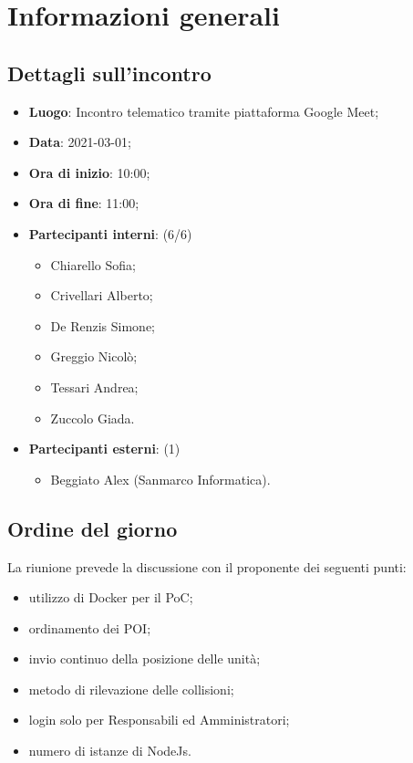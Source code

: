 \section{Informazioni generali}

\subsection{Dettagli sull'incontro}
\begin{itemize}
\item \textbf{Luogo}: Incontro telematico tramite piattaforma Google Meet;
\item \textbf{Data}: 2021-03-01;
\item \textbf{Ora di inizio}: 10:00;
\item \textbf{Ora di fine}: 11:00;
\item \textbf{Partecipanti interni}: (6/6)
\begin{itemize}
	\item Chiarello Sofia;
	\item Crivellari Alberto;
	\item De Renzis Simone;
	\item Greggio Nicolò;
	\item Tessari Andrea;
	\item Zuccolo Giada.
\end{itemize}
\item \textbf{Partecipanti esterni}: (1)
\begin{itemize}
	\item Beggiato Alex (Sanmarco Informatica).
\end{itemize}
\end{itemize}

\subsection{Ordine del giorno}

La riunione prevede la discussione con il proponente dei seguenti punti:
\begin{itemize}
	\item utilizzo di Docker per il PoC;
	\item ordinamento dei POI;
	\item invio continuo della posizione delle unità;
	\item metodo di rilevazione delle collisioni;
	\item login solo per Responsabili ed Amministratori;
	\item numero di istanze di NodeJs.
\end{itemize}




